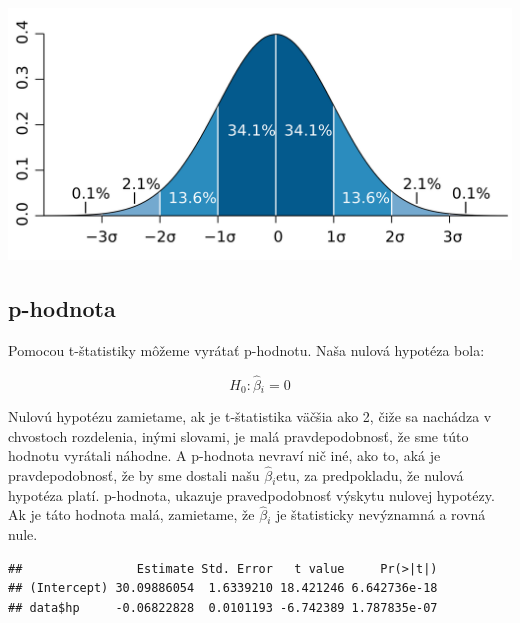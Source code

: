 \begin{center}

\includegraphics{diplomka obrazky/8.png}

\end{center}

\hypertarget{p-hodnota}{%
\subsection{p-hodnota}\label{p-hodnota}}

Pomocou t-štatistiky môžeme vyrátať p-hodnotu. Naša nulová hypotéza
bola:

\[H_0: \hat\beta{}_i = 0\]

Nulovú hypotézu zamietame, ak je t-štatistika väčšia ako 2, čiže sa
nachádza v chvostoch rozdelenia, inými slovami, je malá pravdepodobnosť,
že sme túto hodnotu vyrátali náhodne. A p-hodnota nevraví nič iné, ako
to, aká je pravdepodobnosť, že by sme dostali našu \(\hat\beta{}_i\)etu,
za predpokladu, že nulová hypotéza platí. p-hodnota, ukazuje
pravedpodobnosť výskytu nulovej hypotézy. Ak je táto hodnota malá,
zamietame, že \(\hat\beta{}_i\) je štatisticky nevýznamná a rovná nule.

\begin{Shaded}
\begin{Highlighting}[]

\OperatorTok{$}
\end{Highlighting}
\end{Shaded}

\begin{verbatim}
##                Estimate Std. Error   t value     Pr(>|t|)
## (Intercept) 30.09886054  1.6339210 18.421246 6.642736e-18
## data$hp     -0.06822828  0.0101193 -6.742389 1.787835e-07
\end{verbatim}

